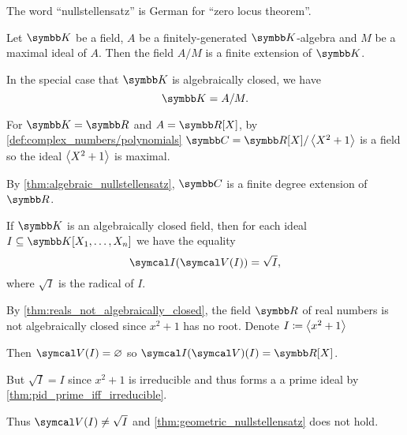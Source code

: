 \begin{remark}\label{remark:nullstelletsatz_etymology}
  The word \enquote{nullstellensatz} is German for \enquote{zero locus theorem}.
\end{remark}

\begin{theorem}\label{thm:algebraic_nullstellensatz}\cite[64]{Коцев2016}
  Let \( \K \) be a field, \( A \) be a finitely-generated \( \K \)-algebra and \( M \) be a maximal ideal of \( A \). Then the field \( A / M \) is a finite extension of \( \K \).

  In the special case that \( \K \) is algebraically closed, we have
  \begin{equation*}
    \K = A / M.
  \end{equation*}
\end{theorem}

\begin{example}\label{ex:algebraic_nullstellensatz_real_over_complex}
  For \( \K = \R \) and \( A = \R[X] \), by \cref{def:complex_numbers/polynomials} \( \C = \R[X] / \Gen{X^2 + 1} \) is a field so the ideal \( \left\langle X^2 + 1 \right\rangle \) is maximal.

  By \cref{thm:algebraic_nullstellensatz}, \( \C \) is a finite degree extension of \( \R \).
\end{example}

\begin{theorem}\label{thm:geometric_nullstellensatz}\cite[70]{Коцев2016}
  If \( \K \) is an algebraically closed field, then for each ideal \( I \subseteq \K[X_1, \ldots, X_n] \) we have the equality
  \begin{equation*}
    \Cal{I}(\Cal{V}(I)) = \sqrt I,
  \end{equation*}
  where \( \sqrt I \) is the radical of \( I \).
\end{theorem}

\begin{example}\label{ex:geometric_nullstellensatz_does_not_hold_for_reals}
  By \cref{thm:reals_not_algebraically_closed}, the field \( \R \) of real numbers is not algebraically closed since \( x^2 + 1 \) has no root. Denote \( I \coloneqq \left\langle x^2 + 1 \right\rangle \)

  Then \( \Cal{V}(I) = \varnothing \) so \( \Cal{I}(\Cal{V})(I) = \R[X] \).

  But \( \sqrt{I} = I \) since \( x^2 + 1 \) is irreducible and thus forms a a prime ideal by \cref{thm:pid_prime_iff_irreducible}.

  Thus \( \Cal{V}(I) \neq \sqrt{I} \) and \cref{thm:geometric_nullstellensatz} does not hold.
\end{example}

